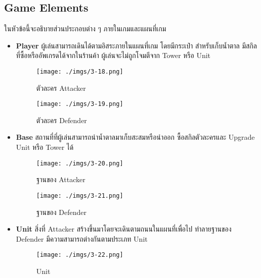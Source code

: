 \documentclass[12pt,oneside,openright,a4paper]{cpe-thai-project}
\begin{document}
\subsection{Game Elements}
ในหัวข้อนี้จะอธิบายส่วนประกอบต่าง ๆ ภายในเกมและแผนที่เกม
\begin{itemize}
  
  \item \textbf{Player} ผู้เล่นสามารถเดินได้ตามอิสระภายในแผนที่เกม โดยมีกระเป๋า
  สำหรับเก็บน้ำตาล มีสกิลที่ซื้อหรืออัพเกรดได้จากในร้านค้า
  ผู้เล่นจะไม่ถูกโจมตีจาก Tower หรือ Unit
  
    \begin{figure}[H]\centering
      \begin{minipage}{.3\textwidth}
        \centering
        \texttt{[image: ./imgs/3-18.png]}
        \caption{ตัวละคร Attacker}\label{fig:3-18}
      \end{minipage}
      \begin{minipage}{.3\textwidth}
        \centering
        \texttt{[image: ./imgs/3-19.png]}
        \caption{ตัวละคร Defender}\label{fig:3-19}
      \end{minipage}
    \end{figure}
  
  \item \textbf{Base} สถานที่ที่ผู้เล่นสามารถนำน้ำตาลมาเก็บสะสมหรือนำออก 
  ซื้อสกิลตัวละครและ Upgrade Unit หรือ Tower ได้
  
    \begin{figure}[H]\centering
      \begin{minipage}{.3\textwidth}
        \centering
        \texttt{[image: ./imgs/3-20.png]}
        \caption{ฐานของ Attacker}\label{fig:3-20}
      \end{minipage}
      \begin{minipage}{.3\textwidth}
        \centering
        \texttt{[image: ./imgs/3-21.png]}
        \caption{ฐานของ Defender}\label{fig:3-21}
      \end{minipage}
    \end{figure}
  
  \item \textbf{Unit} สิ่งที่ Attacker สร้างขึ้นมาโดยจะเดินตามถนนในแผนที่เพื่อไป
  ทำลายฐานของ Defender มีความสามารถต่างกันตามประเภท Unit
    
    \begin{figure}[H]\centering
      \texttt{[image: ./imgs/3-22.png]}
      \caption{Unit}\label{fig:3-22}
    \end{figure}
    

\end{itemize}
\end{document}
